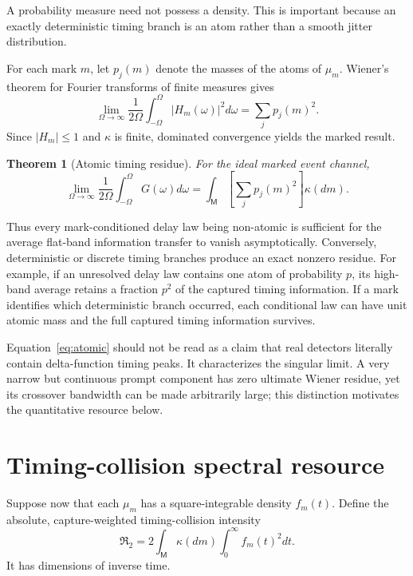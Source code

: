 \documentclass[aps,prapplied,preprint,nofootinbib]{revtex4-2}
\newtheorem{theorem}{Theorem}
\newcommand{\Rtwo}{\mathfrak R_2}
\newcommand{\M}{\mathsf M}
\begin{document}
A probability measure need not possess a density.  This is important because an exactly deterministic timing branch is an atom rather than a smooth jitter distribution.

For each mark $m$, let $p_j(m)$ denote the masses of the atoms of $\mu_m$.  Wiener’s theorem for Fourier transforms of finite measures gives
\begin{equation}
\lim_{\Omega\to\infty}
\frac{1}{2\Omega}
\int_{-\Omega}^{\Omega}|H_m(\omega)|^2d\omega
=\sum_jp_j(m)^2.
\label{eq:wienerSingle}
\end{equation}
Since $|H_m|\le1$ and $\kappa$ is finite, dominated convergence yields the marked result.

\begin{theorem}[Atomic timing residue]
For the ideal marked event channel,
\begin{equation}
\boxed{
\lim_{\Omega\to\infty}
\frac{1}{2\Omega}
\int_{-\Omega}^{\Omega}G(\omega)d\omega
=
\int_{\M}\left[\sum_jp_j(m)^2\right]\kappa(dm).}
\label{eq:atomic}
\end{equation}
\end{theorem}

Thus every mark-conditioned delay law being non-atomic is sufficient for the average flat-band information transfer to vanish asymptotically.  Conversely, deterministic or discrete timing branches produce an exact nonzero residue.  For example, if an unresolved delay law contains one atom of probability $p$, its high-band average retains a fraction $p^2$ of the captured timing information.  If a mark identifies which deterministic branch occurred, each conditional law can have unit atomic mass and the full captured timing information survives.

Equation~\eqref{eq:atomic} should not be read as a claim that real detectors literally contain delta-function timing peaks.  It characterizes the singular limit.  A very narrow but continuous prompt component has zero ultimate Wiener residue, yet its crossover bandwidth can be made arbitrarily large; this distinction motivates the quantitative resource below.

\section{Timing-collision spectral resource}
\label{sec:R2}

Suppose now that each $\mu_m$ has a square-integrable density $f_m(t)$.  Define the absolute, capture-weighted timing-collision intensity
\begin{equation}
\boxed{
\Rtwo=2\int_{\M}\kappa(dm)\int_0^\infty f_m(t)^2dt.}
\label{eq:R2}
\end{equation}
It has dimensions of inverse time.
\end{document}
